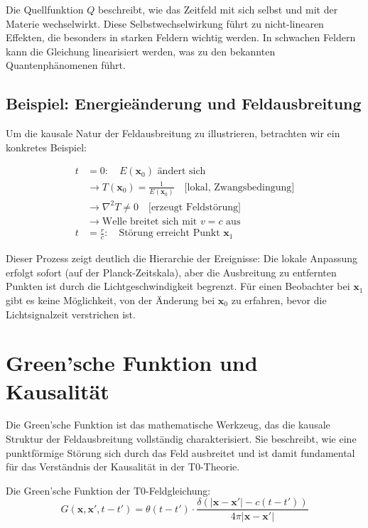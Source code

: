 \documentclass[12pt,a4paper]{article}
\begin{document}
	Die Quellfunktion $Q$ beschreibt, wie das Zeitfeld mit sich selbst und mit der Materie wechselwirkt. Diese Selbstwechselwirkung führt zu nicht-linearen Effekten, die besonders in starken Feldern wichtig werden. In schwachen Feldern kann die Gleichung linearisiert werden, was zu den bekannten Quantenphänomenen führt.
	
	\subsection{Beispiel: Energieänderung und Feldausbreitung}
	
	Um die kausale Natur der Feldausbreitung zu illustrieren, betrachten wir ein konkretes Beispiel:
	
	\begin{align}
		t &= 0: \quad E(\mathbf{x}_0) \text{ ändert sich} \\
		&\rightarrow T(\mathbf{x}_0) = \frac{1}{E(\mathbf{x}_0)} \quad \text{[lokal, Zwangsbedingung]} \\
		&\rightarrow \nabla^2 T \neq 0 \quad \text{[erzeugt Feldstörung]} \\
		&\rightarrow \text{Welle breitet sich mit } v = c \text{ aus} \\
		t &= \frac{r}{c}: \quad \text{Störung erreicht Punkt } \mathbf{x}_1
	\end{align}
	
	Dieser Prozess zeigt deutlich die Hierarchie der Ereignisse: Die lokale Anpassung erfolgt sofort (auf der Planck-Zeitskala), aber die Ausbreitung zu entfernten Punkten ist durch die Lichtgeschwindigkeit begrenzt. Für einen Beobachter bei $\mathbf{x}_1$ gibt es keine Möglichkeit, von der Änderung bei $\mathbf{x}_0$ zu erfahren, bevor die Lichtsignalzeit verstrichen ist.
	
	\section{Green'sche Funktion und Kausalität}
	
	Die Green'sche Funktion ist das mathematische Werkzeug, das die kausale Struktur der Feldausbreitung vollständig charakterisiert. Sie beschreibt, wie eine punktförmige Störung sich durch das Feld ausbreitet und ist damit fundamental für das Verständnis der Kausalität in der T0-Theorie.
	
	Die Green'sche Funktion der T0-Feldgleichung:
	\begin{equation}
		G(\mathbf{x},\mathbf{x}',t-t') = \theta(t-t') \cdot \frac{\delta(|\mathbf{x}-\mathbf{x}'| - c(t-t'))}{4\pi|\mathbf{x}-\mathbf{x}'|} \label{eq:green}
	\end{equation}
	
\end{document}
